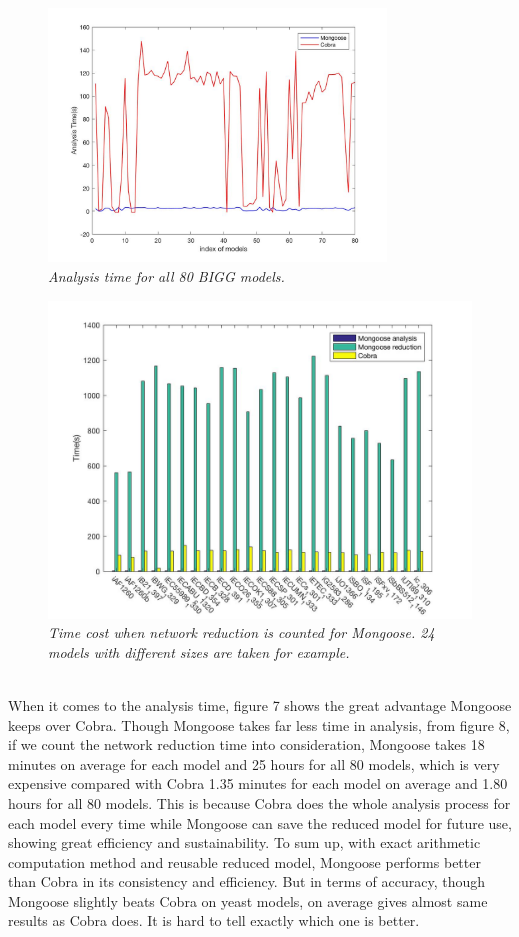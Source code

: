 \documentclass[11pt, a4paper]{article}
\begin{document}
	\begin{figure}[H]
  		\centering
      	\includegraphics[width=0.8\textwidth]{all_model_ana_time.jpg}
      	\caption{\textit{Analysis time for all 80 BIGG models.}}
	\end{figure}
	\begin{figure}[H]
  		\centering
      	\includegraphics[width=1.0\textwidth]{selected_model_time.jpg}
      	\caption{\textit{Time cost when network reduction is counted for Mongoose. 24 models with different sizes are taken for example.}}
	\end{figure}
	~\\When it comes to the analysis time, figure 7 shows the great advantage Mongoose keeps over Cobra. Though Mongoose takes far less time in analysis, from figure 8, if we count the network reduction time into consideration, Mongoose takes 18 minutes on average for each model and 25 hours for all 80 models, which is very expensive compared with Cobra 1.35 minutes for each model on average and 1.80 hours for all 80 models. This is because Cobra does the whole analysis process for each model every time while Mongoose can save the reduced model for future use, showing great efficiency and sustainability. To sum up, with exact arithmetic computation method and reusable reduced model, Mongoose performs better than Cobra in its consistency and efficiency. But in terms of accuracy, though Mongoose slightly beats Cobra on yeast models, on average gives almost same results as Cobra does. It is hard to tell exactly which one is better.
	\newpage
\end{document}
